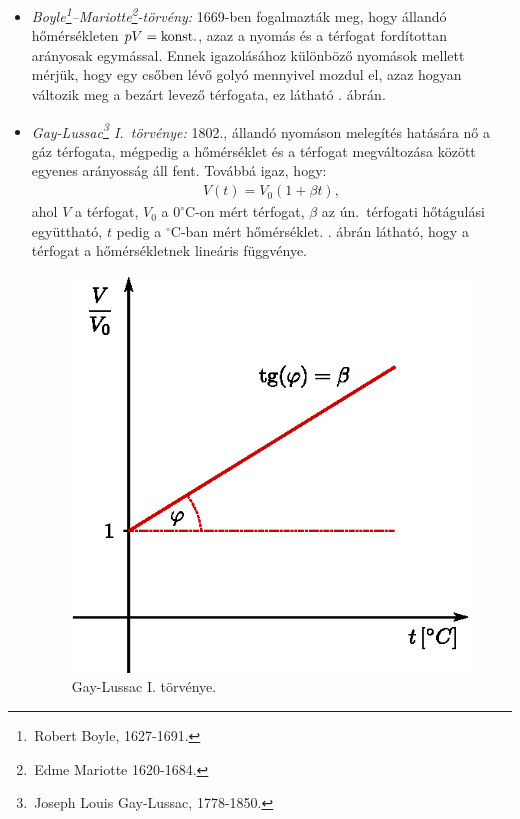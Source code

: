\begin{itemize}
    \item \emph{Boyle\footnote{\,Robert Boyle, 1627-1691.}--Mariotte\footnote{\,Edme Mariotte 1620-1684.}-törvény:} 1669-ben fogalmazták meg, hogy állandó hőmérsékleten $pV = \textnormal{konst.}$, azaz a nyomás és a térfogat fordítottan arányosak egymással. Ennek igazolásához különböző nyomások mellett mérjük, hogy egy csőben lévő golyó mennyivel mozdul el, azaz hogyan változik meg a bezárt levező térfogata, ez látható . ábrán.
    \item \emph{Gay-Lussac\footnote{\,Joseph Louis Gay-Lussac, 1778-1850.} I.~törvénye:} 1802., állandó nyomáson melegítés hatására nő a gáz térfogata, mégpedig a hőmérséklet és a térfogat megváltozása között egyenes arányosság áll fent. Továbbá igaz, hogy:
    \begin{align}
        V(t) = V_0(1+\beta t),
    \end{align}
    ahol $V$ a térfogat, $V_0$ a $0^\circ$C-on mért térfogat, $\beta$ az ún.~térfogati hőtágulási együttható, $t$ pedig a $^\circ$C-ban mért hőmérséklet. . ábrán látható, hogy a térfogat a hőmérsékletnek lineáris függvénye. 
    \begin{figure}[h!]
    \centering
    \includegraphics{termo_1/termo_1_1.eps}
    \caption{Gay-Lussac I. törvénye.}

\end{figure}
\end{itemize}
